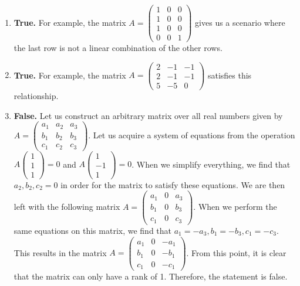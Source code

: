 \documentclass{article}
\begin{document}
\begin{enumerate}
\begin{enumerate}
\item \textbf{True.} For example, the matrix $A = \left(\begin{array}{ccc} 1 & 0 & 0 \\ 1 & 0 & 0 \\ 1 & 0 & 0 \\ 0 & 0 & 1 \end{array}\right)$ gives us a scenario where the last row is not a linear combination of the other rows.

\item \textbf{True.} For example, the matrix $A = \left(\begin{array}{ccc} 2 & -1 & -1 \\ 2 & -1 & -1 \\ 5 & -5 & 0 \end{array}\right)$ satisfies this relationship.

\item \textbf{False.} Let us construct an arbitrary matrix over all real numbers given by $A = \left(\begin{array}{ccc} a_1 & a_2 & a_3 \\ b_1 & b_2 & b_3 \\ c_1 & c_2 & c_3 \end{array}\right)$. Let us acquire a system of equations from the operation $A \left(\begin{array}{c} 1 \\ 1 \\ 1 \end{array}\right) = 0$ and $A \left(\begin{array}{c} 1 \\ -1 \\ 1 \end{array}\right) = 0$. When we simplify everything, we find that $a_2, b_2, c_2 = 0$ in order for the matrix to satisfy these equations. We are then left with the following matrix $A = \left(\begin{array}{ccc} a_1 & 0 & a_3 \\ b_1 & 0 & b_3 \\ c_1 & 0 & c_3 \end{array}\right)$. When we perform the same equations on this matrix, we find that $a_1 = -a_3, b_1 = -b_3, c_1 = -c_3$. This results in the matrix $A = \left(\begin{array}{ccc} a_1 & 0 & -a_1 \\ b_1 & 0 & -b_1 \\ c_1 & 0 & -c_1 \end{array}\right)$. From this point, it is clear that the matrix can only have a rank of 1. Therefore, the statement is false.


\end{enumerate}
\end{enumerate}
\end{document}
